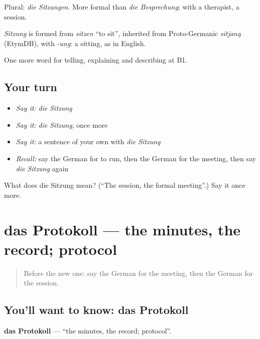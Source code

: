 Plural: \emph{die Sitzungen}. More formal than \emph{die Besprechung}; with a therapist, a session.

\begin{cousinweb}
\emph{Sitzung} is formed from \emph{sitzen} \textquotedblleft{}to sit\textquotedblright{}, inherited from Proto-Germanic \emph{sitjaną} (EtymDB), with \emph{-ung}: a sitting, as in English.
\end{cousinweb}

\begin{grammarlens}[title={What you've built}]
One more word for telling, explaining and describing at B1.
\end{grammarlens}

\subsection*{Your turn}
\begin{itemize}
\raggedright
  \item \emph{Say it:} \emph{die Sitzung}
  \item \emph{Say it:} \emph{die Sitzung}, once more
  \item \emph{Say it:} a sentence of your own with \emph{die Sitzung}
  \item \emph{Recall:} say the German for to run, then the German for the meeting, then say \emph{die Sitzung} again
\end{itemize}

\begin{tcolorbox}[breakable,colback=teal!4,colframe=teal!35!black,title={Before you move on}]
What does die Sitzung mean? (\textquotedblleft{}The session, the formal meeting\textquotedblright{}.) Say it once more.
\end{tcolorbox}
\section[das Protokoll]{das Protokoll — the minutes, the record; protocol}

\label{lesson:GE-C354-protokoll}



\begin{quote}
Before the new one: say the German for the meeting, then the German for the session.
\end{quote}

\subsection*{You'll want to know: das Protokoll}
\textbf{das Protokoll} — \textquotedblleft{}the minutes, the record; protocol\textquotedblright{}.

